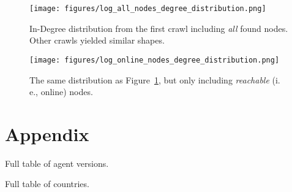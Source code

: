 \documentclass[10pt]{article}
\makeatletter
\newcommand*{\ie}{i.\,e.\@\xspace}
\makeatother
\begin{document}
\begin{figure}[!htb]
\centering
        \texttt{[image: figures/log\_all\_nodes\_degree\_distribution.png]}
        \caption{In-Degree distribution from the first crawl including \emph{all} found nodes. Other crawls yielded similar shapes.}
        \label{fig:log_all_nodes_degree_distribution}
\end{figure}
\begin{figure}[!htb]
        \texttt{[image: figures/log\_online\_nodes\_degree\_distribution.png]}
        \caption{The same distribution as Figure~\ref{fig:log_all_nodes_degree_distribution}, but only including \emph{reachable} (\ie, online) nodes.}
        \label{fig:log_online_nodes_degree_distribution}
\end{figure}



%

\section*{Appendix}
\label{sec:appendix}

Full table of agent versions.


Full table of countries.


\end{document}
